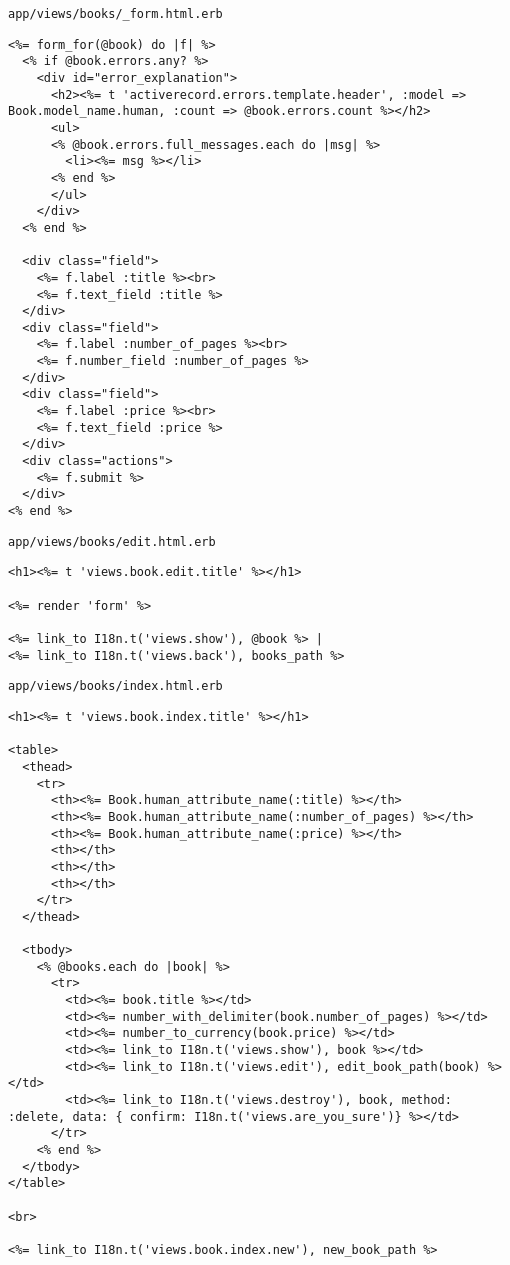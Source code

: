 \documentclass[a4paper]{book}
\newcounter{tab}[chapter]
\begin{document}
\texttt{app/views/books/\_form.html.erb}

\begin{shaded}\begin{verbatim}
<%= form_for(@book) do |f| %>
  <% if @book.errors.any? %>
    <div id="error_explanation">
      <h2><%= t 'activerecord.errors.template.header', :model => Book.model_name.human, :count => @book.errors.count %></h2>
      <ul>
      <% @book.errors.full_messages.each do |msg| %>
        <li><%= msg %></li>
      <% end %>
      </ul>
    </div>
  <% end %>

  <div class="field">
    <%= f.label :title %><br>
    <%= f.text_field :title %>
  </div>
  <div class="field">
    <%= f.label :number_of_pages %><br>
    <%= f.number_field :number_of_pages %>
  </div>
  <div class="field">
    <%= f.label :price %><br>
    <%= f.text_field :price %>
  </div>
  <div class="actions">
    <%= f.submit %>
  </div>
<% end %>
\end{verbatim}\end{shaded}

\texttt{app/views/books/edit.html.erb}

\begin{shaded}\begin{verbatim}
<h1><%= t 'views.book.edit.title' %></h1>

<%= render 'form' %>

<%= link_to I18n.t('views.show'), @book %> |
<%= link_to I18n.t('views.back'), books_path %>
\end{verbatim}\end{shaded}

\texttt{app/views/books/index.html.erb}

\begin{shaded}\begin{verbatim}
<h1><%= t 'views.book.index.title' %></h1>

<table>
  <thead>
    <tr>
      <th><%= Book.human_attribute_name(:title) %></th>
      <th><%= Book.human_attribute_name(:number_of_pages) %></th>
      <th><%= Book.human_attribute_name(:price) %></th>
      <th></th>
      <th></th>
      <th></th>
    </tr>
  </thead>

  <tbody>
    <% @books.each do |book| %>
      <tr>
        <td><%= book.title %></td>
        <td><%= number_with_delimiter(book.number_of_pages) %></td>
        <td><%= number_to_currency(book.price) %></td>
        <td><%= link_to I18n.t('views.show'), book %></td>
        <td><%= link_to I18n.t('views.edit'), edit_book_path(book) %></td>
        <td><%= link_to I18n.t('views.destroy'), book, method: :delete, data: { confirm: I18n.t('views.are_you_sure')} %></td>
      </tr>
    <% end %>
  </tbody>
</table>

<br>

<%= link_to I18n.t('views.book.index.new'), new_book_path %>
\end{verbatim}\end{shaded}
\end{document}
